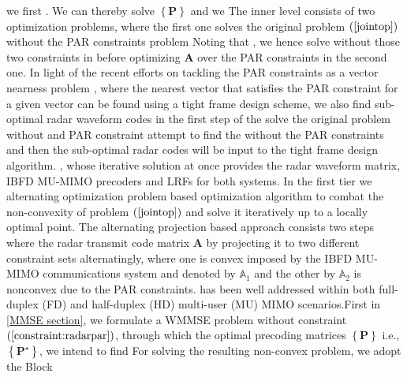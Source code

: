 \documentclass[10pt,journal]{IEEEtran}
\newcommand{\paren}[1]{\left({#1}\right)}
\newcommand{\braces}[1]{{\left\{ {#1}\right\}}}
\theoremstyle{definition}
\begin{document}

  
\iffalse
we first . We can thereby solve $\braces{\mathbf{P}}$  and we The inner level consists of two optimization problems, where the first one solves the original problem $\paren{\ref{jointop}}$ without the PAR constraints  problem Noting that , we hence solve  without those two constraints in  before optimizing $\mathbf{A}$ over the PAR constraints in the second one. In light of the recent efforts on tackling the PAR constraints as a vector nearness problem \cite{NaghshTSP2017,nearestvector}, where the nearest vector that satisfies the PAR constraint for a given vector can be found using a tight frame design scheme, we also find sub-optimal radar waveform codes in the first step of the  solve the original problem without and PAR constraint attempt to find the  without the PAR constraints and then the sub-optimal radar codes will be input to the tight frame design algorithm.  , whose iterative solution at once provides the radar waveform matrix, IBFD MU-MIMO precoders and LRFs for both systems. In the first tier we alternating optimization problem  based optimization algorithm to combat the non-convexity of problem $\paren{\mathrm{\ref{jointop}}}$ and solve it iteratively up to a locally optimal point. The alternating projection based approach consists two steps where the radar transmit code matrix $\mathbf{A}$ by projecting it to two different constraint sets alternatingly, where one is convex imposed by the IBFD MU-MIMO communications system and denoted by $\mathbb{A}_1$ and the other by $\mathbb{A}_2$ is nonconvex due to the PAR constraints. has been well addressed within both full-duplex (FD) and half-duplex (HD) multi-user (MU) MIMO scenarios.First in \ref{MMSE section}, we formulate a WMMSE problem without constraint $\paren{\mathrm{\ref{constraint:radarpar}}}$, through which the optimal precoding matrices $\braces{\mathbf{P}}$ i.e., $\braces{\mathbf{P}^\star}$,  we intend to find 
For solving the resulting non-convex problem, we adopt the Block
\end{document}
